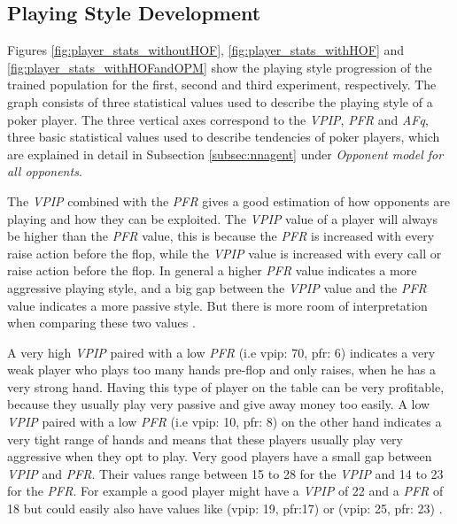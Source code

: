\subsection{Playing Style Development}
Figures \ref{fig:player_stats_withoutHOF}, \ref{fig:player_stats_withHOF} and \ref{fig:player_stats_withHOFandOPM} show the playing style progression of the trained population for the first, second and third experiment, respectively. The graph consists of three statistical values used to describe the playing style of a poker player. The three vertical axes correspond to the \textit{VPIP}, \textit{PFR} and \textit{AFq}, three basic statistical values used to describe tendencies of poker players, which are explained in detail in Subsection \ref{subsec:nnagent} under \textit{Opponent model for all opponents}.\par
The \textit{VPIP} combined with the \textit{PFR} gives a good estimation of how opponents are playing and how they can be exploited. The \textit{VPIP} value of a player will always be higher than the \textit{PFR} value, this is because the \textit{PFR} is increased with every raise action before the flop, while the \textit{VPIP} value is increased with every call or raise action before the flop. In general a higher \textit{PFR} value indicates a more aggressive playing style, and a big gap between the \textit{VPIP} value and the \textit{PFR} value indicates a more passive style. But there is more room of interpretation when comparing these two values \cite{playing_style}.\par
A very high \textit{VPIP} paired with a low \textit{PFR} (i.e vpip: 70, pfr: 6) indicates a very weak player who plays too many hands pre-flop and only raises, when he has a very strong hand. Having this type of player on the table can be very profitable, because they usually play very passive and give away money too easily. A low \textit{VPIP} paired with a low \textit{PFR} (i.e vpip: 10, pfr: 8) on the other hand indicates a very tight range of hands and means that these players usually play very aggressive when they opt to play. Very good players have a small gap between \textit{VPIP} and \textit{PFR}. Their values range between 15 to 28 for the \textit{VPIP} and 14 to 23 for the \textit{PFR}. For example a good player might have a \textit{VPIP} of 22 and a \textit{PFR} of 18 but could easily also have values like (vpip: 19, pfr:17) or (vpip: 25, pfr: 23) \cite{playing_style}.\par
